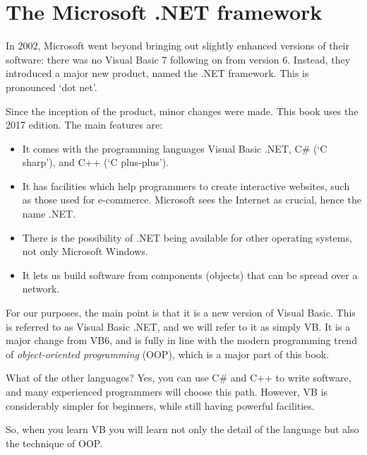 	\section{The Microsoft .NET framework}
		In 2002, Microsoft went beyond bringing out slightly enhanced versions of their software: there was no Visual Basic 7 following on from version 6. Instead, they introduced a major new product, named the .NET framework. This is pronounced ‘dot net’.
		
		Since the inception of the product, minor changes were made. This book uses the 2017 edition.
		The main features are:
		\begin{itemize}
			\item It comes with the programming languages Visual Basic .NET, C\# (‘C sharp’), and C++ (‘C plus-plus’).
			\item	It has facilities which help programmers to create interactive websites, such as those used for e-commerce. Microsoft sees the Internet as crucial, hence the name .NET.
			\item	There is the possibility of .NET being available for other operating systems, not only Microsoft Windows.
			\item	It lets us build software from components (objects) that can be spread over a network.
		\end{itemize}
				
		For our purposes, the main point is that it is a new version of Visual Basic. This is referred to as Visual Basic .NET, and we will refer to it as simply VB. It is a major change from VB6, and is fully in line with the modern programming trend of \emph{object-oriented programming} (OOP), which is a major part of this book.

		What of the other languages? Yes, you can use C\# and C++ to write software, and many experienced programmers will choose this path. However, VB is considerably simpler for beginners, while still having powerful facilities.

So, when you learn VB you will learn not only the detail of the language but also the technique of OOP.

